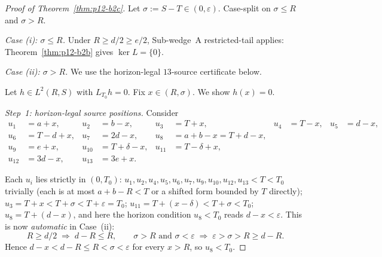 \begin{proof}[Proof of Theorem~\ref{thm:p12-b2c}]
Let $\sigma := S - T \in (0, \varepsilon)$.  Case-split on
$\sigma \le R$ and $\sigma > R$.

\smallskip
\noindent\emph{Case (i): $\sigma \le R$.}  Under $R \ge d/2 \ge e/2$,
Sub-wedge~A restricted-tail applies:
Theorem~\ref{thm:p12-b2b} gives $\ker L = \{0\}$.

\smallskip
\noindent\emph{Case (ii): $\sigma > R$.}  We use the horizon-legal
$13$-source certificate below.

\medskip
Let $h \in L^{2}(R, S)$ with $L_{T_{0}} h = 0$.  Fix
$x \in (R, \sigma)$.  We show $h(x) = 0$.

\smallskip
\noindent\emph{Step~1: horizon-legal source positions.}  Consider
\begin{align*}
u_{1} &= a + x, & u_{2} &= b - x, & u_{3} &= T + x, & u_{4} &= T - x,
& u_{5} &= d - x,\\
u_{6} &= T - d + x, & u_{7} &= 2d - x, & u_{8} &= a + b - x = T + d - x,\\
u_{9} &= e + x, & u_{10} &= T + \delta - x, & u_{11} &= T - \delta + x,\\
u_{12} &= 3d - x, & u_{13} &= 3e + x.
\end{align*}

Each $u_{i}$ lies strictly in $(0, T_{0})$:
$u_{1}, u_{2}, u_{4}, u_{5}, u_{6}, u_{7}, u_{9}, u_{10}, u_{12}, u_{13}
< T < T_{0}$ trivially (each is at most $a + b - R < T$ or a shifted
form bounded by $T$ directly);
$u_{3} = T + x < T + \sigma < T + \varepsilon = T_{0}$;
$u_{11} = T + (x - \delta) < T + \sigma < T_{0}$;
$u_{8} = T + (d - x)$, and here the horizon condition
$u_{8} < T_{0}$ reads $d - x < \varepsilon$.  This is now
\emph{automatic} in Case~(ii):
\[
R \ge d/2 \;\Longrightarrow\; d - R \le R,
\qquad
\sigma > R \text{ and } \sigma < \varepsilon
\;\Longrightarrow\; \varepsilon > \sigma > R \ge d - R.
\]
Hence $d - x < d - R \le R < \sigma < \varepsilon$ for every
$x > R$, so $u_{8} < T_{0}$.


\end{proof}
